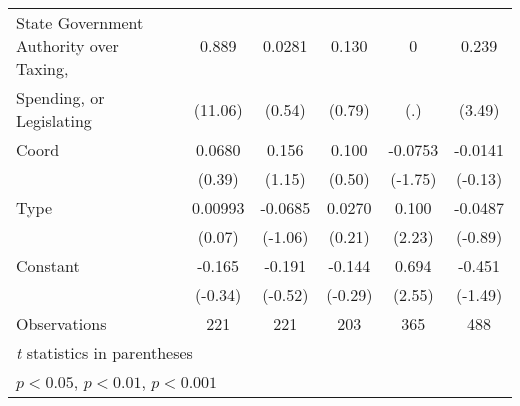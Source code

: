 {\begin{tabular}{l*{5}{c}}
\addlinespace
State Government Authority over Taxing, &0.889\sym{***}&0.0281         &0.130         &    0         &0.239\sym{**} \\
Spending, or Legislating                &(11.06)         &(0.54)         &(0.79)         &  (.)         &(3.49)         \\
\addlinespace
Coord                                   &0.0680         &0.156         &0.100         &-0.0753         &-0.0141         \\
                                        &(0.39)         &(1.15)         &(0.50)         &(-1.75)         &(-0.13)         \\
\addlinespace
Type                                    &0.00993         &-0.0685         &0.0270         &0.100\sym{*}  &-0.0487         \\
                                        &(0.07)         &(-1.06)         &(0.21)         &(2.23)         &(-0.89)         \\
\addlinespace
Constant                                &-0.165         &-0.191         &-0.144         &0.694\sym{*}  &-0.451         \\
                                        &(-0.34)         &(-0.52)         &(-0.29)         &(2.55)         &(-1.49)         \\
\midrule
Observations                            &  221         &  221         &  203         &  365         &  488         \\
\bottomrule
\multicolumn{6}{l}{\footnotesize \textit{t} statistics in parentheses}\\
\multicolumn{6}{l}{\footnotesize \sym{*} \(p<0.05\), \sym{**} \(p<0.01\), \sym{***} \(p<0.001\)}\\
\end{tabular}
}

